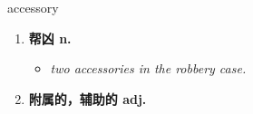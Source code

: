 
\begin{frame}
{\huge accessory}
\begin{center}
\begin{enumerate}\Large
  \item \textbf{帮凶 n.}
  \begin{itemize}
    \item \em{\Large{two accessories in the robbery case.}}
  \end{itemize}
  \item \textbf{附属的，辅助的 adj.}
\end{enumerate}
\end{center}
\end{frame}
